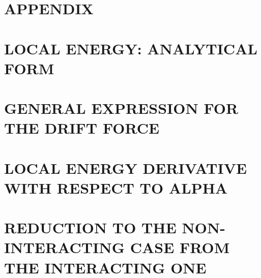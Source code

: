 \documentclass[a4paper]{article}
\begin{document}
\begin{multicols}{2}
\printbibliography
\end{multicols}

\newpage
\begin{multicols*}{2}
\section*{APPENDIX}
\appendix
\section{LOCAL ENERGY: ANALYTICAL FORM}
\label{appendix:local_energy}


\section{GENERAL EXPRESSION FOR THE DRIFT FORCE}
\label{appendix:drift_force_general}

\section{LOCAL ENERGY DERIVATIVE WITH RESPECT TO ALPHA}
\label{appendix:local_energy_derivative}

\section{REDUCTION TO THE NON-INTERACTING CASE FROM THE INTERACTING ONE}
\label{appendix:interacting_reduced_as_non_interacting}


\end{multicols*}
\end{document}
